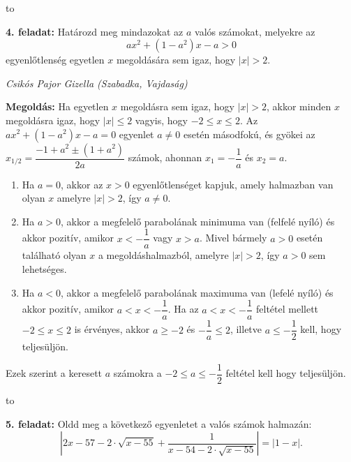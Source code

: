 \documentclass[a4paper,10pt,leqno]{article}
\newcommand{\ki}[2]{\hfill {\it #1 (#2)}\medskip}
\newcommand{\vonal}{\hbox to \hsize{\hskip2truecm\hrulefill\hskip2truecm}}
\begin{document}
\begin{center}
\end{center}

\vonal


{\bf 4. feladat: } Határozd meg mindazokat az $a$ valós számokat, melyekre az 
$$ax^2+(1-a^2)x-a>0$$
egyenlőtlenség egyetlen $x$ megoldására sem igaz, hogy $|x|>2$.

\ki{Csikós Pajor Gizella}{Szabadka, Vajdaság}\medskip

{\bf Megoldás: } Ha egyetlen $x$ megoldásra sem igaz, hogy $|x|>2$, akkor minden $x$ megoldásra igaz, hogy $|x|\le 2$ vagyis, hogy $-2\le x \le 2$.
Az $ax^2+(1-a^2)x-a=0$ egyenlet $a\ne 0$ esetén másodfokú, és gyökei az $x_{1/2}=\dfrac{-1+a^2\pm(1+a^2)}{2a}$ számok, ahonnan $x_1=-\dfrac{1}{a}$ és $x_2=a$.
 
\begin{enumerate}
\item Ha $a=0$, akkor az $x>0$ egyenlőtlenséget kapjuk, amely halmazban van olyan $x$ amelyre $|x|>2$, így $a\ne 0$.  

\item Ha $a>0$, akkor a megfelelő parabolának minimuma van (felfelé nyíló) és akkor pozitív, amikor $x<-\dfrac{1}{a}$ vagy $x>a$. Mivel bármely $a>0$  esetén található olyan $x$ a megoldáshalmazból, amelyre $|x|>2$, így $a>0$ sem lehetséges.

\item Ha $a<0$, akkor a megfelelő parabolának maximuma van (lefelé nyíló) és akkor pozitív, amikor $a<x<-\dfrac{1}{a}$. Ha az $a<x<-\dfrac{1}{a}$ feltétel mellett $-2\le x \le 2$ is érvényes, akkor $a\ge -2$ és $-\dfrac{1}{a}\le 2$, illetve $a\le -\dfrac{1}{2}$ kell, hogy teljesüljön. 
\end{enumerate}

Ezek szerint a keresett $a$ számokra a $-2\le a \le -\dfrac{1}{2}$ feltétel kell hogy teljesüljön.


\vonal


{\bf 5. feladat: } Oldd meg a következő egyenletet a valós számok halmazán:
$$\left|2x-57-2\cdot\sqrt{x-55}+\frac{1}{x-54-2\cdot\sqrt{x-55}}\right|=|1-x|.$$
\end{document}
